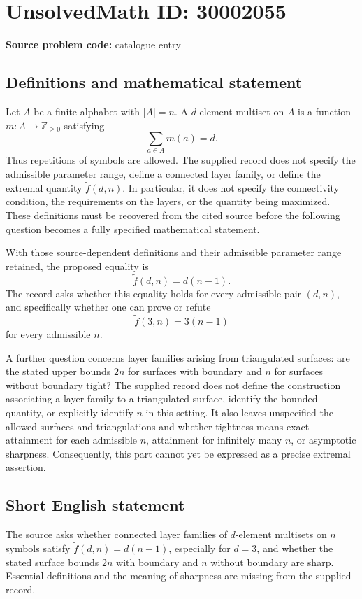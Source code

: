 \documentclass[11pt]{article}
\newcommand{\Z}{\mathbb{Z}}
\begin{document}
\section*{UnsolvedMath ID: 30002055}
\textbf{Source problem code:} catalogue entry
\subsection{Definitions and mathematical statement}
Let \(A\) be a finite alphabet with \(|A|=n\). A \(d\)-element multiset on \(A\) is a function \(m:A\to\Z_{\geq 0}\) satisfying
\[
\sum_{a\in A}m(a)=d.
\]
Thus repetitions of symbols are allowed. The supplied record does not specify the admissible parameter range, define a connected layer family, or define the extremal quantity \(\widetilde f(d,n)\). In particular, it does not specify the connectivity condition, the requirements on the layers, or the quantity being maximized. These definitions must be recovered from the cited source before the following question becomes a fully specified mathematical statement.

With those source-dependent definitions and their admissible parameter range retained, the proposed equality is
\[
\widetilde f(d,n)=d(n-1).
\]
The record asks whether this equality holds for every admissible pair \((d,n)\), and specifically whether one can prove or refute
\[
\widetilde f(3,n)=3(n-1)
\]
for every admissible \(n\).

A further question concerns layer families arising from triangulated surfaces: are the stated upper bounds \(2n\) for surfaces with boundary and \(n\) for surfaces without boundary tight? The supplied record does not define the construction associating a layer family to a triangulated surface, identify the bounded quantity, or explicitly identify \(n\) in this setting. It also leaves unspecified the allowed surfaces and triangulations and whether tightness means exact attainment for each admissible \(n\), attainment for infinitely many \(n\), or asymptotic sharpness. Consequently, this part cannot yet be expressed as a precise extremal assertion.
\subsection{Short English statement}
The source asks whether connected layer families of \(d\)-element multisets on \(n\) symbols satisfy \(\widetilde f(d,n)=d(n-1)\), especially for \(d=3\), and whether the stated surface bounds \(2n\) with boundary and \(n\) without boundary are sharp. Essential definitions and the meaning of sharpness are missing from the supplied record.
\end{document}
